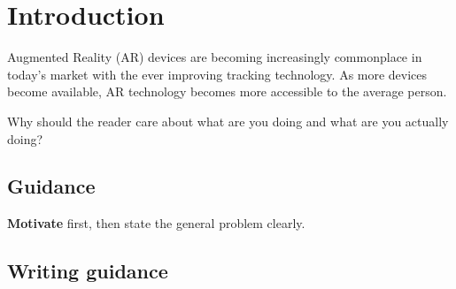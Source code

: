 \documentclass{l4proj}
\begin{document}
%
%
%
%
%
%
%
%
\chapter{Introduction}


Augmented Reality (AR) devices are becoming increasingly commonplace in today's market with the ever improving tracking technology. As more devices become available, AR technology becomes more accessible to the average person. 

Why should the reader care about what are you doing and what are you actually doing?
\section{Guidance}

\textbf{Motivate} first, then state the general problem clearly. 

\section{Writing guidance}
\end{document}
